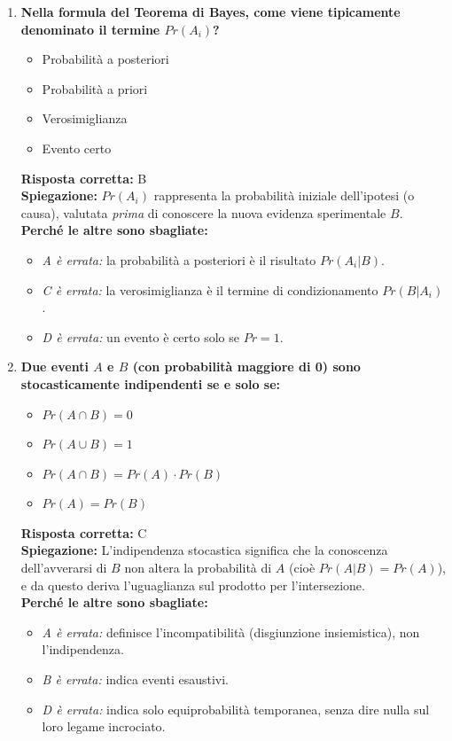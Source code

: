 \documentclass[12pt, a4paper]{article}
\begin{document}
\begin{enumerate}[label=\textbf{\arabic*.}]
    \item \textbf{Nella formula del Teorema di Bayes, come viene tipicamente denominato il termine $Pr(A_i)$?}
    \begin{itemize}
        \item[A)] Probabilità a posteriori
        \item[B)] Probabilità a priori
        \item[C)] Verosimiglianza
        \item[D)] Evento certo
    \end{itemize}
    \textbf{Risposta corretta:} B \\
    \textbf{Spiegazione:} $Pr(A_i)$ rappresenta la probabilità iniziale dell'ipotesi (o causa), valutata \textit{prima} di conoscere la nuova evidenza sperimentale $B$. \\
    \textbf{Perché le altre sono sbagliate:}
    \begin{itemize}
        \item \textit{A è errata:} la probabilità a posteriori è il risultato $Pr(A_i | B)$.
        \item \textit{C è errata:} la verosimiglianza è il termine di condizionamento $Pr(B | A_i)$.
        \item \textit{D è errata:} un evento è certo solo se $Pr = 1$.
    \end{itemize}

    \item \textbf{Due eventi $A$ e $B$ (con probabilità maggiore di 0) sono stocasticamente indipendenti se e solo se:}
    \begin{itemize}
        \item[A)] $Pr(A \cap B) = 0$
        \item[B)] $Pr(A \cup B) = 1$
        \item[C)] $Pr(A \cap B) = Pr(A) \cdot Pr(B)$
        \item[D)] $Pr(A) = Pr(B)$
    \end{itemize}
    \textbf{Risposta corretta:} C \\
    \textbf{Spiegazione:} L'indipendenza stocastica significa che la conoscenza dell'avverarsi di $B$ non altera la probabilità di $A$ (cioè $Pr(A|B) = Pr(A)$), e da questo deriva l'uguaglianza sul prodotto per l'intersezione. \\
    \textbf{Perché le altre sono sbagliate:}
    \begin{itemize}
        \item \textit{A è errata:} definisce l'incompatibilità (disgiunzione insiemistica), non l'indipendenza.
        \item \textit{B è errata:} indica eventi esaustivi.
        \item \textit{D è errata:} indica solo equiprobabilità temporanea, senza dire nulla sul loro legame incrociato.
    \end{itemize}


\end{enumerate}
\end{document}
